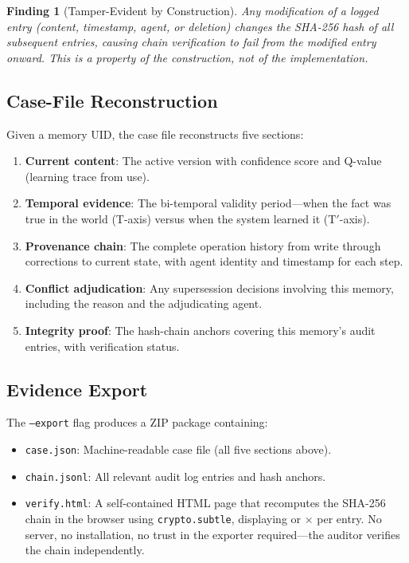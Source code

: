\documentclass{article}
\newtheorem{finding}{Finding}
\begin{document}
\begin{finding}[Tamper-Evident by Construction]
Any modification of a logged entry (content, timestamp, agent, or deletion) changes the SHA-256 hash of all subsequent entries, causing chain verification to fail from the modified entry onward. This is a property of the construction, not of the implementation.
\end{finding}

\subsection{Case-File Reconstruction}

Given a memory UID, the case file reconstructs five sections:

\begin{enumerate}
\item \textbf{Current content}: The active version with confidence score and Q-value (learning trace from use).
\item \textbf{Temporal evidence}: The bi-temporal validity period---when the fact was true in the world (T-axis) versus when the system learned it (T$'$-axis).
\item \textbf{Provenance chain}: The complete operation history from write through corrections to current state, with agent identity and timestamp for each step.
\item \textbf{Conflict adjudication}: Any supersession decisions involving this memory, including the reason and the adjudicating agent.
\item \textbf{Integrity proof}: The hash-chain anchors covering this memory's audit entries, with verification status.
\end{enumerate}

\subsection{Evidence Export}

The \texttt{--export} flag produces a ZIP package containing:
\begin{itemize}
\item \texttt{case.json}: Machine-readable case file (all five sections above).
\item \texttt{chain.jsonl}: All relevant audit log entries and hash anchors.
\item \texttt{verify.html}: A self-contained HTML page that recomputes the SHA-256 chain in the browser using \texttt{crypto.subtle}, displaying \checkmark{} or $\times$ per entry. No server, no installation, no trust in the exporter required---the auditor verifies the chain independently.
\end{itemize}
\end{document}

